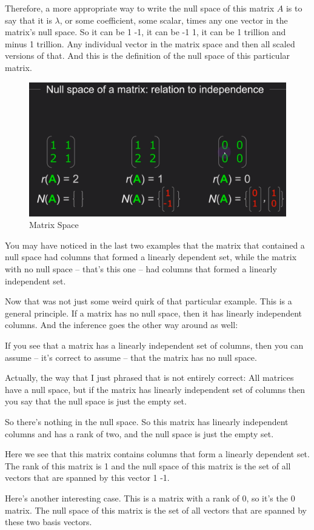 \documentclass[fleqn,10pt]{olplainarticle}
\theoremstyle{definition}
\theoremstyle{remark}
\begin{document}
Therefore, a more appropriate way to write the null space of this matrix $A$ is to say that it is $\lambda$, or some coefficient, some scalar, times any one vector in the matrix's null space. So it can be 1 -1, it can be -1 1, it can be 1 trillion and minus 1 trillion. Any individual vector in the matrix space and then all scaled versions of that. And this is the definition of the null space of this particular matrix.

\begin{figure}[ht]
	\centering
	\includegraphics[width=0.4\linewidth]{images/matrix-space-22.png}
	\caption{Matrix Space}
	\label{fig:matrix_space_22}
\end{figure}

You may have noticed in the last two examples that the matrix that contained a null space had columns that formed a linearly dependent set, while the matrix with no null space -- that's this one -- had columns that formed a linearly independent set.

Now that was not just some weird quirk of that particular example. This is a general principle. If a matrix has no null space, then it has linearly independent columns. And the inference goes the other way around as well:

If you see that a matrix has a linearly independent set of columns, then you can assume -- it's correct to assume -- that the matrix has no null space.

Actually, the way that I just phrased that is not entirely correct: All matrices have a null space, but if the matrix has linearly independent set of columns then you say that the null space is just the empty set.

So there's nothing in the null space. So this matrix has linearly independent columns and has a rank of two, and the null space is just the empty set.

Here we see that this matrix contains columns that form a linearly dependent set. The rank of this matrix is 1 and the null space of this matrix is the set of all vectors that are spanned by this vector 1 -1.

Here's another interesting case. This is a matrix with a rank of 0, so it's the 0 matrix. The null space of this matrix is the set of all vectors that are spanned by these two basis vectors.
\end{document}
